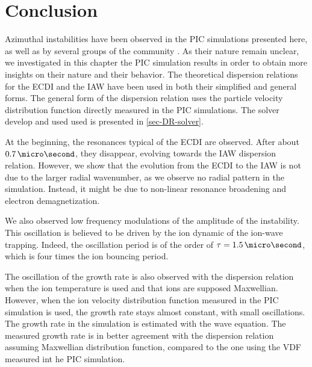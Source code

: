 
\section{Conclusion}
  Azimuthal instabilities have been observed in the \ac{PIC} simulations presented here, as well as by several groups of the community \citep{hara2019a,janhunen2018,taccogna2019}.
  As their nature remain unclear, we investigated in this chapter the \ac{PIC} simulation results in order to obtain more insights on their nature and their behavior.
  The theoretical dispersion relations for the \ac{ECDI} and the \ac{IAW} have been used in both their simplified and general forms.
  The general form of the dispersion relation uses the particle velocity distribution function directly measured in the \ac{PIC} simulations.
  The solver develop and used used is presented in \cref{sec-DR-solver}.
  
  At the beginning, the resonances typical of the \ac{ECDI} are observed.
  After about $0.7\,\micro\second$, they disappear, evolving towards the \ac{IAW} dispersion relation.
  However, we show that the evolution from the \ac{ECDI} to the \ac{IAW}  is not due to the larger radial wavenumber, as we observe no radial pattern in the simulation.
  Instead, it might be due to non-linear resonance broadening and electron demagnetization.
  
  \vspace{1ex}
  We also observed low frequency modulations of the amplitude of the instability.
  This oscillation is believed to be driven by the ion dynamic of the ion-wave trapping.
  Indeed, the oscillation period is of the order of $\tau=1.5\,\micro\second$, which is four times the ion bouncing period.
  
  The oscillation of the growth rate is also observed with the dispersion relation when the ion temperature is used and that ions are supposed Maxwellian.
  However, when the ion velocity distribution function measured in the \ac{PIC}  simulation is used, the growth rate stays almost constant, with small oscillations.
  The growth rate in the simulation is estimated with the wave equation.
  The measured growth rate is in better agreement with the dispersion relation assuming Maxwellian distribution function, compared to the one using the VDF measured int he PIC simulation.
  
